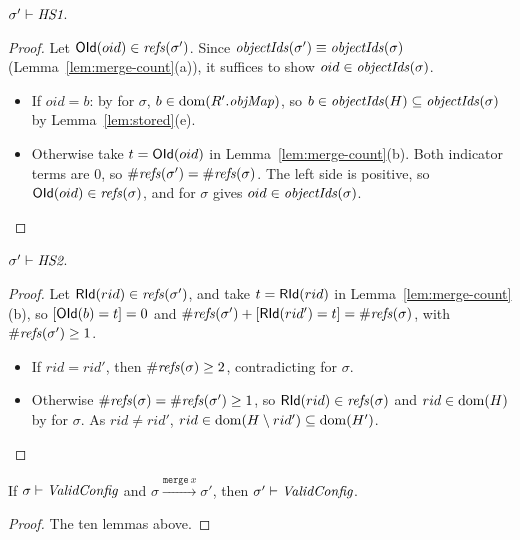 \begin{lemma}[\inv{HS1}] 
$\sigma' \vdash \textit{HS1}$.
\end{lemma}
\begin{proof}
Let $\mathsf{OId}(oid) \in \mathit{refs}(\sigma')$. Since $\mathit{objectIds}(\sigma') \equiv \mathit{objectIds}(\sigma)$
(Lemma~\ref{lem:merge-count}(a)), it suffices to show $oid \in \mathit{objectIds}(\sigma)$.
\begin{itemize}[nosep]
  \item If $oid = b$: by  for $\sigma$, $b \in \mathrm{dom}(R'.\mathit{objMap})$, so
    $b \in \mathit{objectIds}(H) \subseteq \mathit{objectIds}(\sigma)$ by Lemma~\ref{lem:stored}(e).
  \item Otherwise take $t = \mathsf{OId}(oid)$ in Lemma~\ref{lem:merge-count}(b). Both indicator terms are
    $0$, so $\#\mathit{refs}(\sigma') = \#\mathit{refs}(\sigma)$. The left side is positive, so
    $\mathsf{OId}(oid) \in \mathit{refs}(\sigma)$, and  for $\sigma$ gives $oid \in \mathit{objectIds}(\sigma)$.
    \qedhere
\end{itemize}
\end{proof}

\begin{lemma}[\inv{HS2}] 
$\sigma' \vdash \textit{HS2}$.
\end{lemma}
\begin{proof}
Let $\mathsf{RId}(rid) \in \mathit{refs}(\sigma')$, and take $t = \mathsf{RId}(rid)$ in Lemma~\ref{lem:merge-count}(b), so
$[\mathsf{OId}(b) = t] = 0$ and $\#\mathit{refs}(\sigma') + [\mathsf{RId}(rid') = t] = \#\mathit{refs}(\sigma)$, with
$\#\mathit{refs}(\sigma') \ge 1$.
\begin{itemize}[nosep]
  \item If $rid = rid'$, then $\#\mathit{refs}(\sigma) \ge 2$, contradicting  for $\sigma$.
  \item Otherwise $\#\mathit{refs}(\sigma) = \#\mathit{refs}(\sigma') \ge 1$, so $\mathsf{RId}(rid) \in \mathit{refs}(\sigma)$ and
    $rid \in \mathrm{dom}(H)$ by  for $\sigma$. As $rid \ne rid'$, $rid \in \mathrm{dom}(H \setminus rid')
    \subseteq \mathrm{dom}(H')$. \qedhere
\end{itemize}
\end{proof}

\begin{theorem} 
If $\sigma \vdash \textit{ValidConfig}$ and $\sigma \xrightarrow{\texttt{merge}\ x} \sigma'$, then
$\sigma' \vdash \textit{ValidConfig}$.
\end{theorem}
\begin{proof}
The ten lemmas above.
\end{proof}
